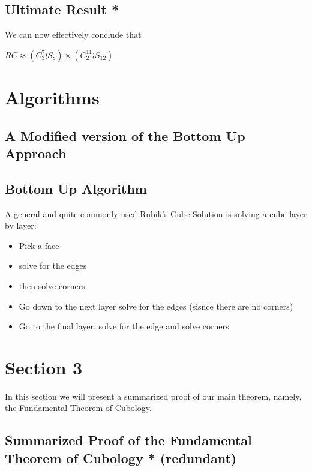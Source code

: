 \subsection{Ultimate Result *}\label{ultimate-result}

We can now effectively conclude that

\(RC \approx (C_{3}^{7} \wr S_{8}) \times (C_{2}^{11} \wr S_{12})\)

\section{Algorithms}\label{algorithms}

\subsection{A Modified version of the Bottom Up
Approach}\label{a-modified-version-of-the-bottom-up-approach}

\subsection{Bottom Up Algorithm}\label{bottom-up-algorithm}

A general and quite commonly used Rubik's Cube Solution is solving a
cube layer by layer:

\begin{itemize}
\tightlist
\item
  Pick a face
\item
  solve for the edges
\item
  then solve corners
\item
  Go down to the next layer solve for the edges (sisnce there are no
  corners)
\item
  Go to the final layer, solve for the edge and solve corners
\end{itemize}

\section{Section 3}\label{section-3}

In this section we will present a summarized proof of our main theorem,
namely, the Fundamental Theorem of Cubology.

\subsection{Summarized Proof of the Fundamental Theorem of Cubology *
(redundant)}\label{summarized-proof-of-the-fundamental-theorem-of-cubology-redundant}

